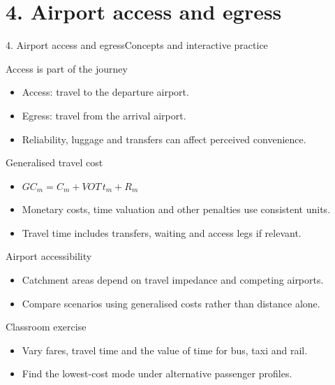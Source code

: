 \documentclass[aspectratio=169,11pt]{beamer}
\begin{document}
\section{4. Airport access and egress}
\begin{frame}{4. Airport access and egress}\centering\Large Concepts and interactive practice\end{frame}
\begin{frame}{Access is part of the journey}\begin{itemize}
\item Access: travel to the departure airport.
\item Egress: travel from the arrival airport.
\item Reliability, luggage and transfers can affect perceived convenience.
\end{itemize}\end{frame}
\begin{frame}{Generalised travel cost}\begin{itemize}
\item $GC_m=C_m+VOT\,t_m+R_m$
\item Monetary costs, time valuation and other penalties use consistent units.
\item Travel time includes transfers, waiting and access legs if relevant.
\end{itemize}\end{frame}
\begin{frame}{Airport accessibility}\begin{itemize}
\item Catchment areas depend on travel impedance and competing airports.
\item Compare scenarios using generalised costs rather than distance alone.
\end{itemize}\end{frame}
\begin{frame}{Classroom exercise}\begin{itemize}
\item Vary fares, travel time and the value of time for bus, taxi and rail.
\item Find the lowest-cost mode under alternative passenger profiles.
\end{itemize}\end{frame}
\end{document}
